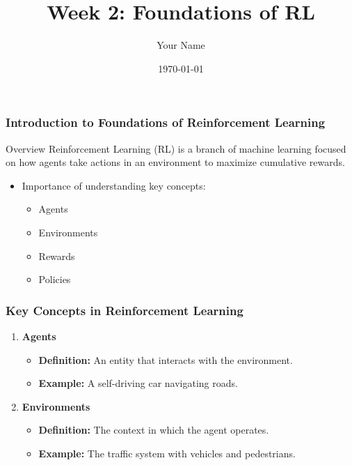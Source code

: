 \documentclass{beamer}
\title{Week 2: Foundations of RL}
\author{Your Name}
\institute{Your Institution}
\date{\today}
\begin{document}
\frame{\titlepage}

\begin{frame}[fragile]
    \frametitle{Introduction to Foundations of Reinforcement Learning}
    \begin{block}{Overview}
        Reinforcement Learning (RL) is a branch of machine learning focused on how agents take actions in an environment to maximize cumulative rewards.
    \end{block}
    \begin{itemize}
        \item Importance of understanding key concepts: 
        \begin{itemize}
            \item Agents
            \item Environments
            \item Rewards
            \item Policies
        \end{itemize}
    \end{itemize}
\end{frame}

\begin{frame}[fragile]
    \frametitle{Key Concepts in Reinforcement Learning}

    \begin{enumerate}
        \item \textbf{Agents}
            \begin{itemize}
                \item \textbf{Definition:} An entity that interacts with the environment.
                \item \textbf{Example:} A self-driving car navigating roads.
            \end{itemize}
        \item \textbf{Environments}
            \begin{itemize}
                \item \textbf{Definition:} The context in which the agent operates.
                \item \textbf{Example:} The traffic system with vehicles and pedestrians.
            \end{itemize}
    \end{enumerate}
\end{frame}
\end{document}
